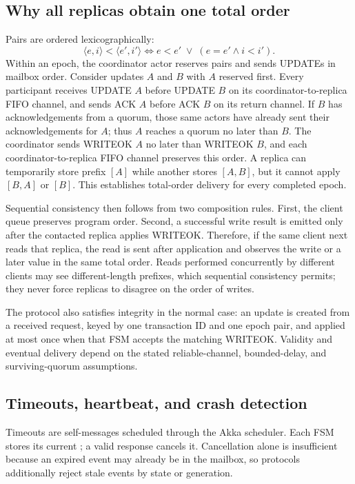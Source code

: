 \subsection{Why all replicas obtain one total order}

Pairs are ordered lexicographically:
\[
\langle e,i\rangle < \langle e',i'\rangle
\iff e<e' \;\lor\; (e=e'\land i<i').
\]
Within an epoch, the coordinator actor reserves pairs and sends UPDATEs in mailbox order. Consider updates $A$ and $B$ with $A$ reserved first. Every participant receives UPDATE $A$ before UPDATE $B$ on its coordinator-to-replica FIFO channel, and sends ACK $A$ before ACK $B$ on its return channel. If $B$ has acknowledgements from a quorum, those same actors have already sent their acknowledgements for $A$; thus $A$ reaches a quorum no later than $B$. The coordinator sends WRITEOK $A$ no later than WRITEOK $B$, and each coordinator-to-replica FIFO channel preserves this order. A replica can temporarily store prefix $[A]$ while another stores $[A,B]$, but it cannot apply $[B,A]$ or $[B]$. This establishes total-order delivery for every completed epoch.

Sequential consistency then follows from two composition rules. First, the client queue preserves program order. Second, a successful write result is emitted only after the contacted replica applies WRITEOK. Therefore, if the same client next reads that replica, the read is sent after application and observes the write or a later value in the same total order. Reads performed concurrently by different clients may see different-length prefixes, which sequential consistency permits; they never force replicas to disagree on the order of writes.

The protocol also satisfies integrity in the normal case: an update is created from a received request, keyed by one transaction ID and one epoch pair, and applied at most once when that FSM accepts the matching WRITEOK. Validity and eventual delivery depend on the stated reliable-channel, bounded-delay, and surviving-quorum assumptions.

\clearpage
\subsection{Timeouts, heartbeat, and crash detection}

Timeouts are self-messages scheduled through the Akka scheduler. Each FSM stores its current ; a valid response cancels it. Cancellation alone is insufficient because an expired event may already be in the mailbox, so protocols additionally reject stale events by state or generation.

